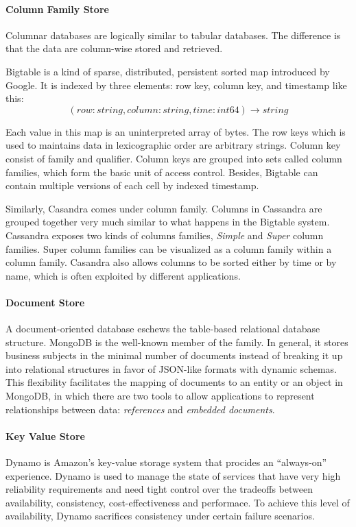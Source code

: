 \documentclass[12pt,letter]{article}
\begin{document}
\paragraph*{Column Family Store}
Columnar databases are logically similar to tabular databases. The difference is that the data are  column-wise stored and retrieved.

Bigtable\citep{Chang2006} is a kind of sparse, distributed, persistent sorted map introduced by Google. It is indexed by three elements: row key, column key, and timestamp like this:
\[ (row:string, column:string, time:int64) \rightarrow string \]

Each value in this map is an uninterpreted array of bytes. The row keys which is used to maintains data in lexicographic order are arbitrary strings. Column key consist of family and qualifier. Column keys are grouped into sets called column families, which form the basic unit of access control. Besides, Bigtable can contain multiple versions of each cell by indexed timestamp.

Similarly, Casandra comes under column family. Columns in Cassandra are grouped together very much similar to what happens in the Bigtable system. Cassandra\citep{LakshamAvinash2010} exposes two kinds of columns families, \textit{Simple} and \textit{Super} column families. Super column families can be visualized as a column family within a column family. Casandra also allows columns to be sorted either by time or by name, which is often exploited by different applications.

\paragraph*{Document Store}
A document-oriented database eschews the table-based relational database structure. MongoDB is the well-known member of the family. In general, it stores business subjects in the minimal number of documents instead of breaking it up into relational structures\citep{Hoberman2014} in favor of JSON-like formats with dynamic schemas.\citep{Suter2012} This flexibility facilitates the mapping of documents to an entity or an object in MongoDB, in which there are two tools to allow applications to represent relationships between data: \textit{references} and \textit{embedded documents}.\citep{MongoDBInc.2009}

\paragraph*{Key Value Store}
Dynamo is Amazon’s key-value storage system that procides an “always-on” experience. Dynamo is used to manage the state of services that have very high reliability requirements and need tight control over the tradeoffs between availability, consistency, cost-effectiveness and performace. To achieve this level of availability, Dynamo sacrifices consistency under certain failure scenarios.
\end{document}
